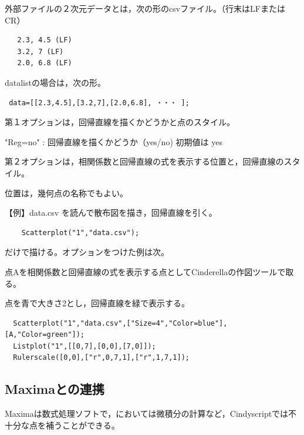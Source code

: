 \documentclass[papersize,a4paper,12pt,uplatex]{jsarticle}
\begin{document}
\begin{description}
外部ファイルの２次元データとは，次の形のcsvファイル。（行末はLFまたはCR）
\begin{verbatim}
   2.3, 4.5 (LF)
   3.2, 7 (LF)
   2.0, 6.8 (LF)
\end{verbatim}


datalistの場合は，次の形。

\begin{verbatim}
 data=[[2.3,4.5],[3.2,7],[2.0,6.8], ・・・ ];
\end{verbatim}


第１オプションは，回帰直線を描くかどうかと点のスタイル。

"Reg=no" : 回帰直線を描くかどうか（yes/no) 初期値は yes
                
第２オプションは，相関係数と回帰直線の式を表示する位置と，回帰直線のスタイル。

位置は，幾何点の名称でもよい。              
                      
\vspace{\baselineskip}
【例】data.csv を読んで散布図を描き，回帰直線を引く。
\begin{verbatim}
    Scatterplot("1","data.csv");
\end{verbatim}

だけで描ける。オプションをつけた例は次。

点Aを相関係数と回帰直線の式を表示する点としてCinderellaの作図ツールで取る。

点を青で大きさ2とし，回帰直線を緑で表示する。

\begin{verbatim}
  Scatterplot("1","data.csv",["Size=4","Color=blue"],[A,"Color=green"]);
  Listplot("1",[[0,7],[0,0],[7,0]]);
  Rulerscale([0,0],["r",0,7,1],["r",1,7,1]);
\end{verbatim}
 
\vspace{\baselineskip}
 \begin{center}  \end{center}

\end{description}
\newpage

\subsection{Maximaとの連携}
Maximaは数式処理ソフトで，\ketcindy においては微積分の計算など，Cindyscriptでは不十分な点を補うことができる。
\end{document}
